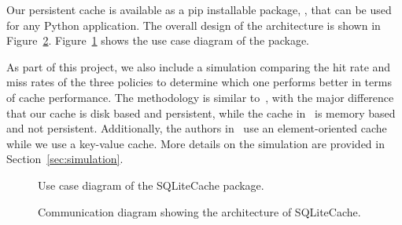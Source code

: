 Our persistent cache is available as a pip installable package,
\sqlitecache, that
can be used for any Python application.
The overall design of the architecture is shown in Figure~\ref{fig:architecture}.
Figure~\ref{fig:use_case_diagram} shows the use case diagram of the package.

As part of this project, we also include a simulation 
comparing the hit rate
and miss rates of the three policies to determine which one performs better
in terms of cache performance. The methodology is similar to~\cite{shah2023ImprovedCacheEviction},
with the major difference that our cache is disk based and persistent,
while the cache in~\cite{shah2023ImprovedCacheEviction} is memory based and not persistent.
Additionally, the authors in~\cite{shah2023ImprovedCacheEviction} use an element-oriented
cache while we use a key-value cache. More details on the simulation
are provided in Section~\ref{sec:simulation}.

\begin{figure}
    \caption{Use case diagram of the SQLiteCache package.}
    \label{fig:use_case_diagram}
\end{figure}

\begin{figure}[ht]
    \centering
    \caption{Communication diagram showing the architecture of SQLiteCache.}
    \label{fig:architecture}
\end{figure}

